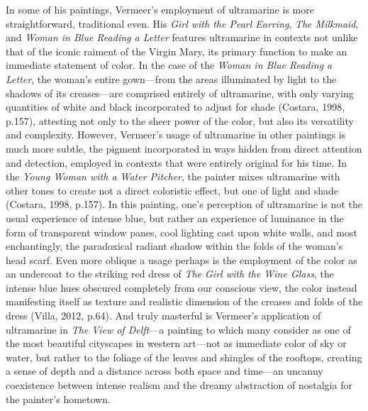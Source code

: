 In some of his paintings, Vermeer's employment of ultramarine is more
straightforward, traditional even. His \emph{Girl with the Pearl
Earring}, \emph{The Milkmaid}, and \emph{Woman in Blue Reading a Letter}
features ultramarine in contexts not unlike that of the iconic raiment
of the Virgin Mary, its primary function to make an immediate statement
of color. In the case of the \emph{Woman in Blue Reading a Letter}, the
woman's entire gown---from the areas illuminated by light to the
shadows of its creases---are comprised entirely of ultramarine, with
only varying quantities of white and black incorporated to adjust for
shade (Costara, 1998, p.157), attesting not only to the sheer power of
the color, but also its versatility and complexity. However, Vermeer's
usage of ultramarine in other paintings is much more subtle, the pigment
incorporated in ways hidden from direct attention and detection,
employed in contexts that were entirely original for his time. In the
\emph{Young Woman with a Water Pitcher}, the painter mixes ultramarine
with other tones to create not a direct coloristic effect, but one of
light and shade (Costara, 1998, p.157). In this painting, one's
perception of ultramarine is not the usual experience of intense blue,
but rather an experience of luminance in the form of transparent window
panes, cool lighting cast upon white walls, and most enchantingly, the
paradoxical radiant shadow within the folds of the woman's head scarf.
Even more oblique a usage perhaps is the employment of the color as an
undercoat to the striking red dress of \emph{The Girl with the Wine
Glass}, the intense blue hues obscured completely from our conscious
view, the color instead manifesting itself as texture and realistic
dimension of the creases and folds of the dress (Villa, 2012, p.64). And
truly masterful is Vermeer's application of ultramarine in \emph{The
View of Delft}---a painting to which many consider as one of the
most beautiful cityscapes in western art---not as immediate color of
sky or water, but rather to the foliage of the leaves and shingles of
the rooftops, creating a sense of depth and a distance across both space
and time---an uncanny coexistence between intense realism and the
dreamy abstraction of nostalgia for the painter's hometown.


